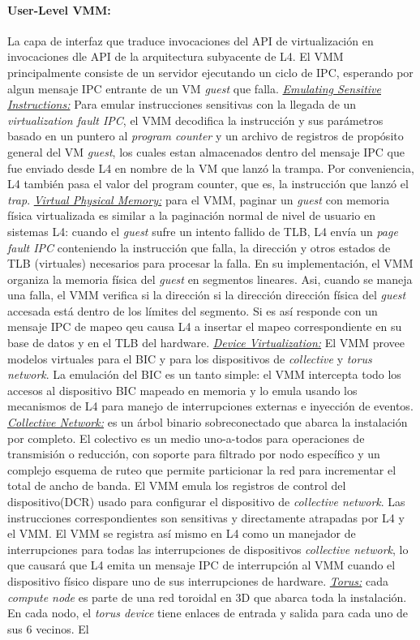 \paragraph{\textnormal{\textbf{User-Level VMM:}}}
La capa de interfaz que traduce invocaciones del API de virtualización en invocaciones dle API de la arquitectura subyacente de L4. El VMM principalmente consiste de un servidor ejecutando un ciclo de IPC, esperando por algun mensaje IPC entrante de un VM \emph{guest} que falla. \underline{\emph{Emulating Sensitive Instructions:}} Para emular instrucciones sensitivas con la llegada de un \emph{virtualization fault IPC}, el VMM decodifica la instrucción y sus parámetros basado en un puntero al \emph{program counter} y un archivo de registros de propósito general del VM \emph{guest}, los cuales estan almacenados dentro del mensaje IPC que fue enviado desde L4 en nombre de la VM que lanzó la trampa. Por conveniencia, L4 también pasa el valor del program counter, que es, la instrucción que lanzó el \emph{trap}. \underline{\emph{Virtual Physical Memory:}} para el VMM, paginar un \emph{guest} con memoria física virtualizada es similar a la paginación normal de nivel de usuario en sistemas L4: cuando el \emph{guest} sufre un intento fallido de TLB, L4 envía un \emph{page fault IPC} conteniendo la instrucción que falla, la dirección y otros estados de TLB (virtuales) necesarios para procesar la falla. En su implementación, el VMM organiza la memoria física del \emph{guest} en segmentos lineares. Asi, cuando se maneja una falla, el VMM verifica  si la dirección si la dirección dirección física del \emph{guest} accesada está dentro de los límites del segmento. Si es así responde con un mensaje IPC de mapeo qeu causa L4 a insertar el mapeo correspondiente en su base de datos y en el TLB del hardware. \underline{\emph{Device Virtualization:}} El VMM provee modelos virtuales para el BIC y para los dispositivos de \emph{collective} y \emph{torus network}. La emulación del BIC es un tanto simple: el VMM intercepta todo los accesos al dispositivo BIC mapeado en memoria y lo emula usando los mecanismos de L4 para manejo de interrupciones externas e inyección de eventos. \underline{\emph{Collective Network:}} es un árbol binario sobreconectado que abarca la instalación por completo. El colectivo es un medio uno-a-todos para operaciones de  transmisión o reducción, con soporte para filtrado por nodo específico y un complejo esquema de ruteo que permite particionar la red para incrementar el total de ancho de banda. El VMM emula los registros de control del dispositivo(DCR) usado para configurar el dispositivo de \emph{collective network}. Las instrucciones correspondientes son sensitivas y directamente atrapadas por L4 y el VMM. El VMM se registra así mismo en L4 como un manejador de interrupciones para todas las interrupciones de dispositivos \emph{collective network}, lo que causará que L4 emita un mensaje IPC de interrupción al VMM cuando el dispositivo físico dispare uno de sus interrupciones de hardware. \underline{\emph{Torus:}} cada \emph{compute node} es parte de una red toroidal en 3D que abarca toda la instalación. En cada nodo, el \emph{torus device} tiene enlaces de entrada y salida para cada uno de sus 6 vecinos. El 